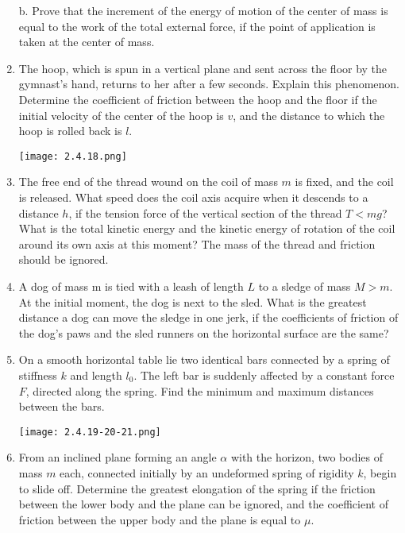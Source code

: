 \documentclass{article}
\begin{document}
\begin{enumerate}[label=2.4.\arabic*]
b. Prove that the increment of the energy of motion of the center of mass is equal to the work of the total external force, if the point of application is taken at the center of mass.



\item The hoop, which is spun in a vertical plane and sent across the floor by the gymnast's hand, returns to her after a few seconds. Explain this phenomenon. Determine the coefficient of friction between the hoop and the floor if the initial velocity of the center of the hoop is $v$, and the distance to which the hoop is rolled back is $l$.

\begin{center}
    \texttt{[image: 2.4.18.png]}
\end{center}


\item The free end of the thread wound on the coil of mass $m$ is fixed, and the coil is released. What speed does the coil axis acquire when it descends to a distance $h$, if the tension force of the vertical section of the thread $T < mg$? What is the total kinetic energy and the kinetic energy of rotation of the coil around its own axis at this moment? The mass of the thread and friction should be ignored.

\item A dog of mass m is tied with a leash of length $L$ to a sledge of mass $M > m$. At the initial moment, the dog is next to the sled. What is the greatest distance a dog can move the sledge in one jerk, if the coefficients of friction of the dog's paws and the sled runners on the horizontal surface are the same?

\item On a smooth horizontal table lie two identical bars connected by a spring of stiffness $k$ and length $l_0$. The left bar is suddenly affected by a constant force $F$, directed along the spring. Find the minimum and maximum distances between the bars.

\begin{center}
    \texttt{[image: 2.4.19-20-21.png]}
\end{center}


\item From an inclined plane forming an angle $\alpha$ with the horizon, two bodies of mass $m$ each, connected initially by an undeformed spring of rigidity $k$, begin to slide off. Determine the greatest elongation of the spring if the friction between the lower body and the plane can be ignored, and the coefficient of friction between the upper body and the plane is equal to $\mu$.


\end{enumerate}
\end{document}
